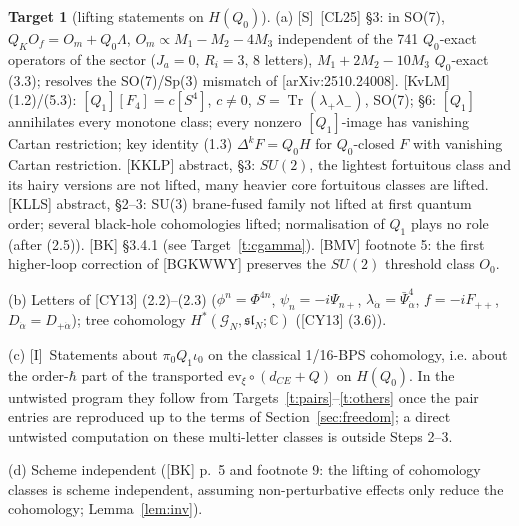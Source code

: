 \documentclass[11pt]{article}
\theoremstyle{definition}
\newtheorem{target}{Target}
\newcommand{\Tr}{\operatorname{Tr}}
\newcommand{\Sl}{\textup{[S]}}
\newcommand{\Il}{\textup{[I]}}
\begin{document}
\begin{target}[lifting statements on $H(Q_0)$]\label{t:lift}
(a) \Sl\ [CL25] \S3: in SO(7), $Q_KO_f=O_m+Q_0\Lambda$, $O_m\propto M_1-M_2-4M_3$ independent of the 741 $Q_0$-exact operators of the sector ($J_a=0$, $R_i=3$, 8 letters), $M_1+2M_2-10M_3$ $Q_0$-exact (3.3); resolves the SO(7)/Sp(3) mismatch of [arXiv:2510.24008]. [KvLM] (1.2)/(5.3): $[Q_1][F_4]=c[S^4]$, $c\neq0$, $S=\Tr(\lambda_+\lambda_-)$, SO(7); \S6: $[Q_1]$ annihilates every monotone class; every nonzero $[Q_1]$-image has vanishing Cartan restriction; key identity (1.3) $\Delta^kF=Q_0H$ for $Q_0$-closed $F$ with vanishing Cartan restriction. [KKLP] abstract, \S3: $SU(2)$, the lightest fortuitous class and its hairy versions are not lifted, many heavier core fortuitous classes are lifted. [KLLS] abstract, \S2--3: SU(3) brane-fused family not lifted at first quantum order; several black-hole cohomologies lifted; normalisation of $Q_1$ plays no role (after (2.5)). [BK] \S3.4.1 (see Target~\ref{t:cgamma}). [BMV] footnote 5: the first higher-loop correction of [BGKWWY] preserves the $SU(2)$ threshold class $O_0$.

(b) Letters of [CY13] (2.2)--(2.3) ($\phi^n=\Phi^{4n}$, $\psi_n=-i\Psi_{n+}$, $\lambda_{\dot\alpha}=\bar\Psi^4_{\dot\alpha}$, $f=-iF_{++}$, $D_{\dot\alpha}=D_{+\dot\alpha}$); tree cohomology $H^*(\mathcal G_N,\mathfrak{sl}_N;\mathbb C)$ ([CY13] (3.6)).

(c) \Il\ Statements about $\pi_0Q_1\iota_0$ on the classical 1/16-BPS cohomology, i.e. about the order-$\hbar$ part of the transported $\mathrm{ev}_\xi\circ(d_{CE}+Q)$ on $H(Q_0)$. In the untwisted program they follow from Targets~\ref{t:pairs}--\ref{t:others} once the pair entries are reproduced up to the terms of Section~\ref{sec:freedom}; a direct untwisted computation on these multi-letter classes is outside Steps 2--3.

(d) Scheme independent ([BK] p.~5 and footnote 9: the lifting of cohomology classes is scheme independent, assuming non-perturbative effects only reduce the cohomology; Lemma~\ref{lem:inv}).
\end{target}
\end{document}
